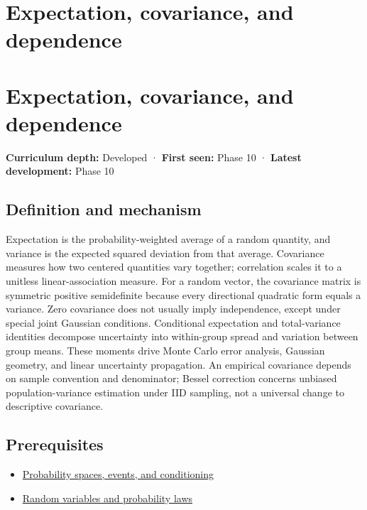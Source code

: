 \hypertarget{appendix-54c383df9992}{}
\section*{Expectation, covariance, and dependence}
\section{Expectation, covariance, and dependence}\label{appendix-54c383df9992-expectation-covariance-and-dependence}

\textbf{Curriculum depth:} Developed · \textbf{First seen:} Phase 10 · \textbf{Latest development:} Phase 10

\subsection{Definition and mechanism}\label{appendix-54c383df9992-definition-and-mechanism}

Expectation is the probability-weighted average of a random quantity, and variance is the expected squared deviation from that average. Covariance measures how two centered quantities vary together; correlation scales it to a unitless linear-association measure. For a random vector, the covariance matrix is symmetric positive semidefinite because every directional quadratic form equals a variance. Zero covariance does not usually imply independence, except under special joint Gaussian conditions. Conditional expectation and total-variance identities decompose uncertainty into within-group spread and variation between group means. These moments drive Monte Carlo error analysis, Gaussian geometry, and linear uncertainty propagation. An empirical covariance depends on sample convention and denominator; Bessel correction concerns unbiased population-variance estimation under IID sampling, not a universal change to descriptive covariance.

\subsection{Prerequisites}\label{appendix-54c383df9992-prerequisites}

\begin{itemize}
\tightlist
\item
  \hyperref[appendix-f1ef323f6ed7]{Probability spaces, events, and conditioning}
\item
  \hyperref[appendix-4d0203f7944f]{Random variables and probability laws}
\end{itemize}

